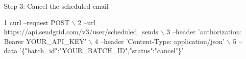 Step 3\+: Cancel the scheduled email 
\begin{DoxyCode}
1 curl --request POST \(\backslash\)
2   --url https://api.sendgrid.com/v3/user/scheduled\_sends \(\backslash\)
3   --header 'authorization: Bearer YOUR\_API\_KEY' \(\backslash\)
4   --header 'Content-Type: application/json' \(\backslash\)
5   --data '\{"batch\_id":"YOUR\_BATCH\_ID","status":"cancel"\}'
\end{DoxyCode}
 